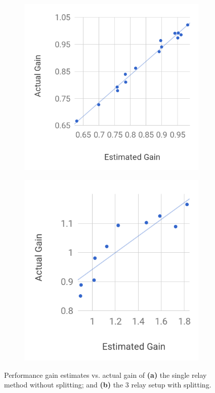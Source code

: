 \documentclass[10pt,sigconf]{acmart}
\providecommand{\vs}{vs. }
\begin{document}
\begin{figure}[t]
  \centering
  
    \begin{subfigure}{0.47\columnwidth}
  \centering
  \includegraphics[width=\columnwidth]{figures/gainEstimateVsActual-nat-1hop-newer}
    \caption{}
    \label{fig:rtt-estimate-nat-1hop}
\end{subfigure} \hfill
\begin{subfigure}{0.47\columnwidth}
  \centering
  \includegraphics[width=\columnwidth]{figures/gainEstimateVsActual-ssh-3hop-newer}
    \caption{} \label{fig:rtt-estimate-ssh-3hop}
\end{subfigure}
    \caption{Performance gain estimates \vs actual gain of \textbf{(a)} the single relay method without splitting; and \textbf{(b)} the 3 relay setup with splitting.}
\end{figure}
\end{document}
